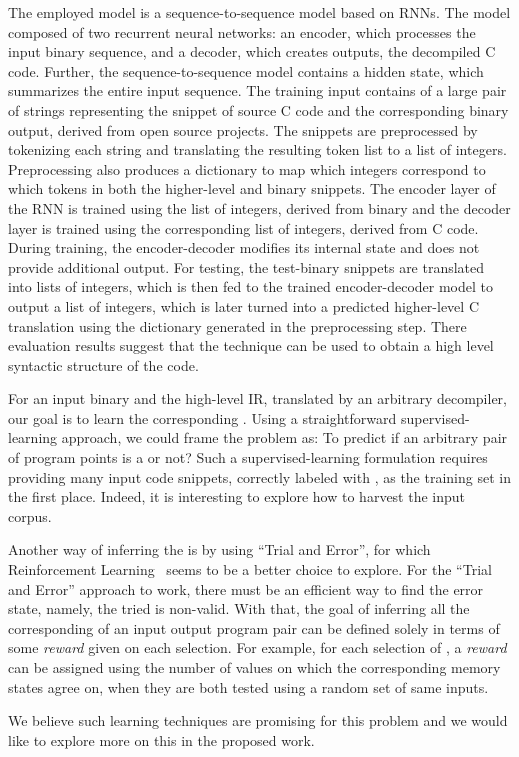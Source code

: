 The employed model is  a sequence-to-sequence model based on RNNs. The model
composed of two recurrent neural networks: an encoder, which processes the
input binary sequence, and a decoder, which creates outputs, the decompiled C
code. Further, the sequence-to-sequence model contains a hidden state, which
summarizes the entire input sequence. 
%
The training input contains of a large pair of strings representing the snippet
of source C code and the corresponding binary output, derived from open source
projects.  The snippets are preprocessed  by tokenizing each string  and
translating the resulting token list to a list of integers. Preprocessing also
produces a dictionary to map which integers correspond to which tokens in both
the higher-level and binary snippets.  The encoder layer of the RNN is trained
using the list of integers, derived from binary and the decoder layer is
trained using the corresponding list of integers, derived from C code.  During
training, the encoder-decoder modifies its internal state and does not provide
additional output. For testing, the test-binary snippets are translated into
lists of integers, which is then fed to the trained encoder-decoder model to
output a list of integers, which  is later turned into  a predicted higher-level C
translation using the dictionary  generated in the preprocessing step.
%
There evaluation results suggest that the technique  can be used to obtain a high level
syntactic structure of the code.
    
    
For an input binary and the high-level IR, translated by an arbitrary
decompiler, our goal is to learn the corresponding \syncp. Using a
straightforward  supervised-learning approach, we could frame the problem as:
To predict if an arbitrary pair of program points is a \syncp or not?
Such a supervised-learning formulation requires providing  many input code
snippets, correctly labeled with \syncps, as the training set in the first
place. Indeed, it is interesting to explore how to harvest the input corpus. 
 

Another way of inferring the \syncps is by using ``Trial and Error'', for which
Reinforcement Learning~\cite{Sutton:1998} seems to be a better choice to
explore. For the ``Trial and Error'' approach to work, there must be an
efficient way to find the error state, namely, the tried \syncp is non-valid.
With that, the goal of inferring all the corresponding \syncps of an input
output program pair can be defined solely in terms of some \emph{reward} given
on each selection. For example, for each selection of \syncp, a \emph{reward}
can be assigned using the number of values on which the corresponding memory
states agree on, when they are both tested using a random set of same  inputs.

We believe such learning techniques are promising for this problem and we would like to explore more on this in the proposed work.
